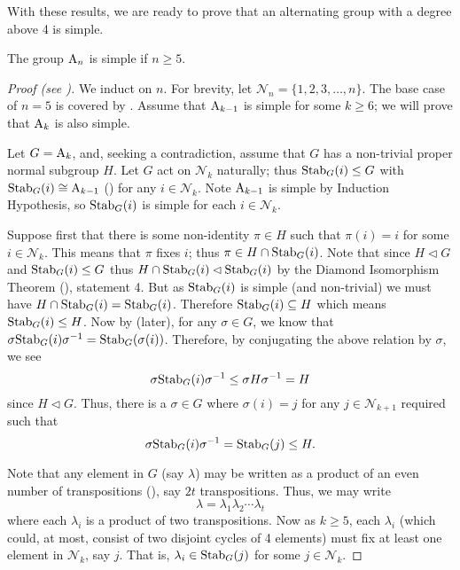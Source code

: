 With these results, we are ready to prove that an alternating group with a degree above 4 is simple.
\begin{theorem}\label{thrm-An-is-simple-for-n>=5}
    The group $\mathrm{A}_{n}$ is simple if $n \geq 5$.
\end{theorem}
\begin{proof}[Proof (see {\cite[Theorem 4.24]{dummit_foote_2004}})]
    We induct on $n$. For brevity, let $\mathcal{N}_n = \{1, 2, 3, \dots, n\}$. The base case of $n = 5$ is covered by . Assume that $\mathrm{A}_{k-1}$ is simple for some $k \geq 6$; we will prove that $\mathrm{A}_{k}$ is also simple.

    Let $G = \mathrm{A}_{k}$, and, seeking a contradiction, assume that $G$ has a non-trivial proper normal subgroup $H$. Let $G$ act on $\mathcal{N}_{k}$ naturally; thus $\mathrm{Stab}_{G}(i) \leq G$ with $\mathrm{Stab}_{G}(i) \cong \mathrm{A}_{k-1}$ () for any $i \in \mathcal{N}_k$. Note $\mathrm{A}_{k-1}$ is simple by Induction Hypothesis, so $\mathrm{Stab}_{G}(i)$ is simple for each $i \in \mathcal{N}_{k}$.

    Suppose first that there is some non-identity $\pi \in H$ such that $\pi(i) = i$ for some $i \in \mathcal{N}_{k}$. This means that $\pi$ fixes $i$; thus $\pi \in H \cap \mathrm{Stab}_{G}(i)$. Note that since $H \lhd G$ and $\mathrm{Stab}_{G}(i) \leq G$ thus $H \cap \mathrm{Stab}_{G}(i) \lhd \mathrm{Stab}_{G}(i)$ by the Diamond Isomorphism Theorem (), statement 4. But as $\mathrm{Stab}_{G}(i)$ is simple (and non-trivial) we must have $H \cap \mathrm{Stab}_{G}(i) = \mathrm{Stab}_{G}(i)$. Therefore $\mathrm{Stab}_{G}(i) \subseteq H$ which means $\mathrm{Stab}_{G}(i) \leq H$. Now by  (later), for any $\sigma \in G$, we know that $\sigma\mathrm{Stab}_{G}(i)\sigma^{-1} = \mathrm{Stab}_{G}(\sigma(i))$. Therefore, by conjugating the above relation by $\sigma$, we see
    \[
        \sigma\mathrm{Stab}_{G}(i)\sigma^{-1} \leq \sigma H\sigma^{-1} = H
    \]
    since $H \lhd G$. Thus, there is a $\sigma \in G$ where $\sigma(i) = j$ for any $j \in \mathcal{N}_{k+1}$ required such that
    \[
        \sigma\mathrm{Stab}_{G}(i)\sigma^{-1} = \mathrm{Stab}_{G}(j) \leq H.
    \]
    
    Note that any element in $G$ (say $\lambda$) may be written as a product of an even number of transpositions (), say $2t$ transpositions. Thus, we may write
    \[
        \lambda = \lambda_1\lambda_2\cdots\lambda_t
    \]
    where each $\lambda_i$ is a product of two transpositions. Now as $k \geq 5$, each $\lambda_i$ (which could, at most, consist of two disjoint cycles of 4 elements) must fix at least one element in $\mathcal{N}_{k}$, say $j$. That is, $\lambda_i \in \mathrm{Stab}_{G}(j)$ for some $j \in \mathcal{N}_{k}$.
    

\end{proof}
